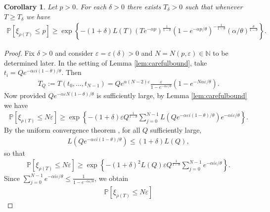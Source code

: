 \documentclass[a4,12pt]{amsart}
\numberwithin{equation}{section}
\newtheorem{cor}[thm]{Corollary}
\begin{document}
	\begin{cor} \label{cor:lowprob}
		Let $p > 0$. For each $\delta > 0$ there exists $T_\delta>0$ 
		such that whenever $T \geq T_\delta$ we have
		\begin{align*} 
			\mathbb{P}\left[ \xi_{\rho(T)} \leq p \right] 
			\geq \exp \left\{ -  (1+\delta) L(T) (T e^{ - \alpha p} )^{\frac{1}{1-\theta}} 
			(1 - e^{ - \alpha p /\theta} )^{-\frac{1}{1-\theta}} 
			(\alpha/\theta)^{\frac{\theta}{1-\theta}} \right\}.
		\end{align*}
	\end{cor}

	\begin{proof}
		Fix $\delta>0$ and consider $\varepsilon = \varepsilon(\delta)>0$ and $N = N(p,\varepsilon) \in \mathbb{N}$
		to be determined later.
		In the setting of Lemma \ref{lem:carefulbound}, take 
		$t_i = Q e^{ - \alpha \varepsilon i(1-\theta)/\theta}$. Then
		\begin{align} \label{eq:pintor}
			T_Q := T(t_0,\ldots,t_{N-1}) =Q  e^{ \alpha(N-2)\varepsilon } 
			\frac{\varepsilon}{1-e^{-\alpha \varepsilon/\theta}}( 1 - e^{ - N \alpha \varepsilon/\theta} ) .
		\end{align}
		Now provided $Q e^{ - \alpha \varepsilon N(1-\theta)/\theta} $ 
		is sufficiently large, by Lemma \ref{lem:carefulbound} we have
		\begin{align*}
		\mathbb{P}\left[ \xi_{\rho(T)} \leq N\varepsilon \right] 
			\geq \exp \left\{ - (1+\delta) \varepsilon Q^{ \frac{1}{1-\theta}} \sum_{j = 0}^{N-1} L(Q e^{ - \alpha \varepsilon i(1-\theta)/\theta} ) e^{ - \alpha i \varepsilon /\theta}    \right\} .
		\end{align*}
		By the uniform convergence theorem \cite[Section 1.2]{bingham1989regular}, 
		for all $Q$ sufficiently large,
		\begin{align*}
			L(Q e^{ - \alpha \varepsilon i(1-\theta)/\theta} )  \leq (1 + \delta ) L(Q),
		\end{align*}
		so that
		\begin{align*}
			\mathbb{P}\left[ \xi_{\rho(T)} \leq N\varepsilon \right]
			\geq \exp \left\{ - (1+\delta)^2 L(Q) \varepsilon Q^{ \frac{1}{1-\theta}} 
			\sum_{j = 0}^{N-1} e^{ - \alpha i \varepsilon /\theta}    \right\} .
		\end{align*}
		Since 
		$\sum_{j = 0}^{N-1} e^{ - \alpha i \varepsilon /\theta}  
		\leq  \frac{1}{1-e^{-\alpha\varepsilon/\theta}}$, we obtain
		\begin{align*} 
		\mathbb{P}\left[ \xi_{\rho(T)} \leq N\varepsilon \right]

\end{align*}
\end{proof}
\end{document}
